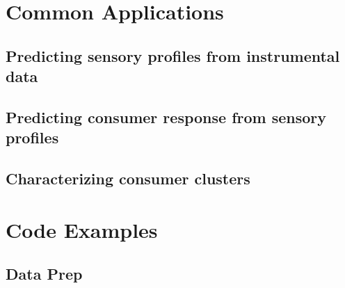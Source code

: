 \documentclass[
]{book}
\begin{document}
\hypertarget{common-applications}{%
\section{Common Applications}\label{common-applications}}

\hypertarget{predicting-sensory-profiles-from-instrumental-data}{%
\subsection{Predicting sensory profiles from instrumental data}\label{predicting-sensory-profiles-from-instrumental-data}}

\hypertarget{predicting-consumer-response-from-sensory-profiles}{%
\subsection{Predicting consumer response from sensory profiles}\label{predicting-consumer-response-from-sensory-profiles}}

\hypertarget{characterizing-consumer-clusters}{%
\subsection{Characterizing consumer clusters}\label{characterizing-consumer-clusters}}

\hypertarget{code-examples}{%
\section{Code Examples}\label{code-examples}}

\hypertarget{data-prep-1}{%
\subsection{Data Prep}\label{data-prep-1}}
\end{document}
